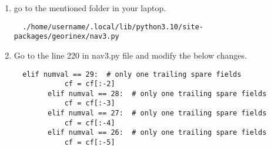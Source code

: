 \begin{enumerate}
\item go to the mentioned folder in your laptop.
\begin{lstlisting}
  ./home/username/.local/lib/python3.10/site-packages/georinex/nav3.py
\end{lstlisting}
\item Go to the line 220 in nav3.py file and modify the below changes.
\begin{lstlisting}
  elif numval == 29:  # only one trailing spare fields
            cf = cf[:-2]
        elif numval == 28:  # only one trailing spare fields
            cf = cf[:-3]
        elif numval == 27:  # only one trailing spare fields
            cf = cf[:-4]
        elif numval == 26:  # only one trailing spare fields
            cf = cf[:-5]
\end{lstlisting}
\end{enumerate}
